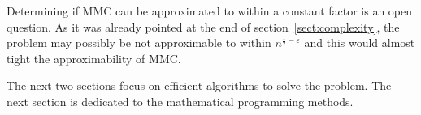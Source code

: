 

Determining if MMC can be approximated to within a constant factor is an open question. As it was already pointed at the end of section~\ref{sect:complexity}, the problem may possibly be not approximable to within $n^{\frac{1}{2}-\varepsilon}$ and this would almost tight the approximability of MMC.

The next two sections focus on efficient algorithms to solve the problem. The next section is dedicated to the mathematical programming methods.